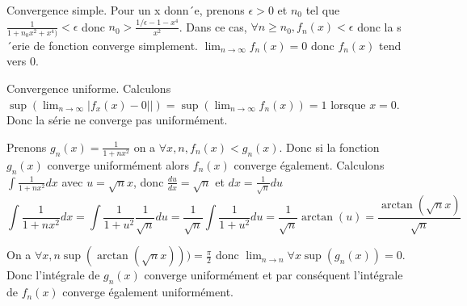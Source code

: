 \documentclass[]{book}
\theoremstyle{definition}
\begin{document}
Convergence simple. Pour un x donn´e, prenons $\epsilon> 0$ et $n_0$ tel que $\frac{1}{1+n_0x^2+x^4)} < \epsilon$ donc $n_0 > \frac{1/\epsilon-1-x^4}{x^2}$. Dans ce cas, $\forall n \geq n_0, f_n(x) < \epsilon$ donc la s´erie de fonction converge simplement. $\lim_{n \to \infty}{f_n(x)} = 0$ donc $f_n(x)$ tend vers 0.


Convergence uniforme. Calculons $\sup(\lim_{n \to \infty} {|f_x(x) - 0||}) =  \sup(\lim_{n \to \infty} {f_n(x)}) = 1$ lorsque $x=0$. Donc la s\'erie ne converge pas uniform\'ement.

Prenons $g_n(x) = \frac{1}{1+nx^2}$ on a $\forall x, n, f_n(x) < g_n(x)$. Donc si la fonction $g_n(x)$ converge uniform\'ement alors $f_n(x)$ converge \'egalement. Calculons $\int{\frac{1}{1+nx^2} dx}$ avec $u = \sqrt{n}x$, donc $\frac{du}{dx} = \sqrt{n}$ et $dx= \frac{1}{\sqrt{n}} du$
$$
\int{\frac{1}{1+nx^2} dx} = \int{\frac{1}{1+u^2} \frac{1}{\sqrt{n}} du} = \frac{1}{\sqrt{n}} \int{\frac{1}{1+u^2} du} = \frac{1}{\sqrt{n}} \arctan(u) = \frac{\arctan(\sqrt{n}x)}{\sqrt{n}} 
$$

On a $\forall x, n \sup(\arctan(\sqrt{n}x))) = \frac{\pi}{2}$ donc $\lim_{n \to n} \forall x \sup(g_n(x)) = 0$. Donc l'int\'egrale de $g_n(x)$ converge uniform\'ement et par cons\'equent l'int\'egrale de $f_n(x)$ converge \'egalement uniform\'ement.
\end{document}
